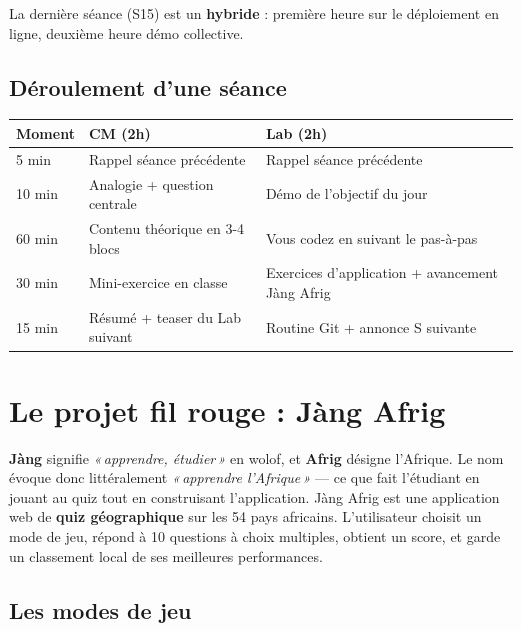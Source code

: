 \documentclass[11pt,a4paper]{article}
\begin{document}
La dernière séance (S15) est un \textbf{hybride} : première heure sur le
déploiement en ligne, deuxième heure démo collective.

\subsection{Déroulement d'une séance}

\begin{center}
\begin{tabular}{@{}p{2.5cm}p{5.5cm}p{5.5cm}@{}}
\toprule
\textbf{Moment} & \textbf{CM (2h)} & \textbf{Lab (2h)} \\
\midrule
5 min    & Rappel séance précédente & Rappel séance précédente \\
10 min   & Analogie + question centrale & Démo de l'objectif du jour \\
60 min   & Contenu théorique en 3-4 blocs & Vous codez en suivant le pas-à-pas \\
30 min   & Mini-exercice en classe & Exercices d'application + avancement Jàng Afrig \\
15 min   & Résumé + teaser du Lab suivant & Routine Git + annonce S suivante \\
\bottomrule
\end{tabular}
\end{center}

\newpage

\section{Le projet fil rouge : Jàng Afrig}

\textbf{Jàng} signifie \textit{«\,apprendre, étudier\,»} en wolof, et \textbf{Afrig} désigne l'Afrique. Le nom évoque donc littéralement \textit{«\,apprendre l'Afrique\,»} --- ce que fait l'étudiant en jouant au quiz tout en construisant l'application.
Jàng Afrig est une application web de \textbf{quiz géographique} sur les 54
pays africains. L'utilisateur choisit un mode de jeu, répond à 10 questions
à choix multiples, obtient un score, et garde un classement local de ses
meilleures performances.

\subsection{Les modes de jeu}
\end{document}
